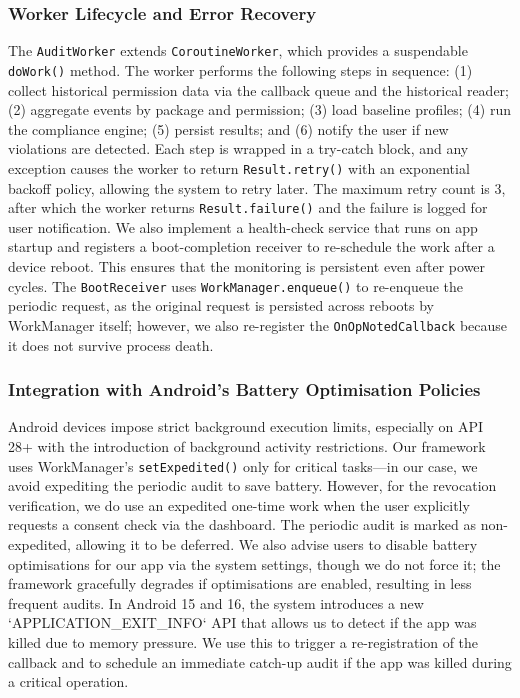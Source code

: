 \subsubsection{Worker Lifecycle and Error Recovery}

The \texttt{AuditWorker} extends \texttt{CoroutineWorker}, which provides a suspendable \texttt{doWork()} method. The worker performs the following steps in sequence: (1) collect historical permission data via the callback queue and the historical reader; (2) aggregate events by package and permission; (3) load baseline profiles; (4) run the compliance engine; (5) persist results; and (6) notify the user if new violations are detected. Each step is wrapped in a try-catch block, and any exception causes the worker to return \texttt{Result.retry()} with an exponential backoff policy, allowing the system to retry later. The maximum retry count is 3, after which the worker returns \texttt{Result.failure()} and the failure is logged for user notification. We also implement a health-check service that runs on app startup and registers a boot-completion receiver to re-schedule the work after a device reboot. This ensures that the monitoring is persistent even after power cycles. The \texttt{BootReceiver} uses \texttt{WorkManager.enqueue()} to re-enqueue the periodic request, as the original request is persisted across reboots by WorkManager itself; however, we also re-register the \texttt{OnOpNotedCallback} because it does not survive process death.

\subsubsection{Integration with Android's Battery Optimisation Policies}

Android devices impose strict background execution limits, especially on API 28+ with the introduction of background activity restrictions. Our framework uses WorkManager's \texttt{setExpedited()} only for critical tasks—in our case, we avoid expediting the periodic audit to save battery. However, for the revocation verification, we do use an expedited one-time work when the user explicitly requests a consent check via the dashboard. The periodic audit is marked as non-expedited, allowing it to be deferred. We also advise users to disable battery optimisations for our app via the system settings, though we do not force it; the framework gracefully degrades if optimisations are enabled, resulting in less frequent audits. In Android 15 and 16, the system introduces a new `APPLICATION_EXIT_INFO` API that allows us to detect if the app was killed due to memory pressure. We use this to trigger a re-registration of the callback and to schedule an immediate catch-up audit if the app was killed during a critical operation.

